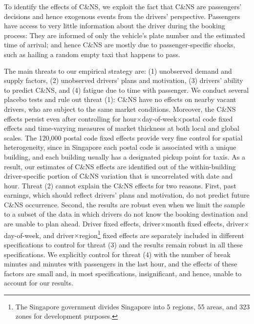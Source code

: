 \documentclass[reviewmode,AEJ]{AEA}
\begin{document}

To identify the effects of C\&NS, we exploit the fact that C\&NS are passengers' decisions 
and hence
exogenous events from the drivers' perspective.
Passengers have access to very little information about the driver during the booking process: They are informed of only the vehicle's plate number and the estimated time of arrival; and hence C\&NS are mostly due to passenger-specific shocks, such as hailing a random empty taxi that happens to pass.

The main threats to our empirical strategy are: (1) unobserved demand and supply factors, (2) unobserved drivers' plans and motivation, (3) drivers' ability to predict C\&NS, and (4) fatigue due to time with passenger. We conduct several placebo tests and rule out threat (1): C\&NS have no effects on nearby vacant drivers, who are subject to the same market conditions. Moreover, the C\&NS effects persist even after controlling for hour\(\times\)day-of-week\(\times\)postal code fixed effects and time-varying measures of market thickness at both local and global scales.
The 120,000 postal code fixed effects provide very fine control for spatial 
heterogeneity, since in Singapore each postal code is associated with a unique building, and each building
usually has a designated pickup point for taxis. As a result, our estimates of C\&NS effects are identified 
out of the within-building driver-specific portion of C\&NS variation that is uncorrelated with date and hour. 
Threat (2) cannot explain the C\&NS effects for two reasons. First, past earnings, which should reflect drivers' plans and motivation, do not predict future C\&NS occurrence. Second, the results are robust even when we limit the sample to a subset of the data in which drivers do not know the booking destination and are unable to plan ahead. Driver fixed effects, driver\(\times\)month fixed effects, driver\(\times\)day-of-week, and driver\(\times\)region\footnote {The Singapore government divides Singapore into 5 regions, 55 areas, and 323 zones for development purposes.} fixed effects are separately included in different specifications to control for threat (3) and the results remain robust in all these specifications. We explicitly control for threat (4) with the number of break minutes and minutes with passengers in the last hour, and the effects of these factors are small and, in most specifications, insignificant, and hence, unable to account for our results.
\end{document}
